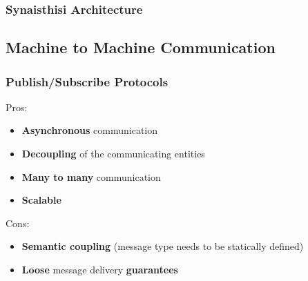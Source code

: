 \begin{frame}
\frametitle{Synaisthisi Architecture}

\begin{figure}[!htb]
\centering
{}
\end{figure}

\end{frame}

\subsection{Machine to Machine Communication}


\begin{frame}
\frametitle{Publish/Subscribe Protocols}
Pros:

\begin{itemize}
\item \textbf{Asynchronous} communication
\item \textbf{Decoupling} of the communicating entities
\item \textbf{Many to many} communication
\item \textbf{Scalable}
\end{itemize}

Cons:
\begin{itemize}
\item \textbf{Semantic coupling} (message type needs to be statically defined)
\item \textbf{Loose} message delivery \textbf{guarantees}
\end{itemize}

\end{frame}


